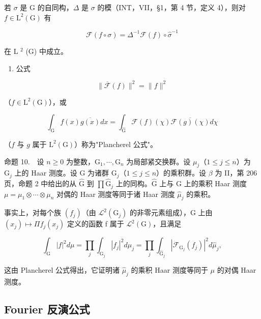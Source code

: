 若 \(\sigma\) 是 G 的自同构，\(\Delta\) 是 \(\sigma\) 的模（INT，VII，§1，第 4 节，定义 4），则对 \(f \in \mathrm{L}^2(\mathrm{G})\) 有

\[
\mathcal {F} (f \circ \sigma) = \Delta^ {- 1} \mathcal {F} (f) \circ \widehat {\sigma} ^ {- 1}
\]

在 L \(^{2}\) (G) 中成立。

\begin{enumerate}
\def\labelenumi{\arabic{enumi})}
\setcounter{enumi}{1}
\tightlist
\item
  公式
\end{enumerate}

\[
\| \overline {{\mathcal {F}}} (f) \| ^ {2} = \| f \| ^ {2}\tag{23}
\]

（\(f\in \mathrm{L}^2 (\mathrm{G})\)），或

\[
\int_ {\mathrm{G}} f (x) \overline {{g (x)}} d x = \int_ {\widehat {\mathrm{G}}} \mathcal {F} (f) (\chi) \overline {{\mathcal {F} (g) (\chi)}} d \chi\tag{24}
\]

（\(f\) 与 \(g\) 属于 \(\mathrm{L}^2 (\mathrm{G})\)）称为"Plancherel 公式"。

命题 10.　设 \(n \geqslant 0\) 为整数，\(\mathrm{G}_{1}, \cdots, \mathrm{G}_{n}\) 为局部紧交换群。设 \(\mu_{j}\)（\(1 \leqslant j \leqslant n\)）为 \(\mathrm{G}_{j}\) 上的 Haar 测度。设 G 为诸群 \(\mathrm{G}_{j}\)（\(1 \leqslant j \leqslant n\)）的乘积群。设 \(\beta\) 为 II，第 206 页，命题 2 中给出的从 \(\widehat{\mathrm{G}}\) 到 \(\prod \widehat{\mathrm{G}}_{j}\) 上的同构。\(\widehat{\mathrm{G}}\) 上与 G 上的乘积 Haar 测度 \(\mu = \mu_{1} \otimes \cdots \otimes \mu_{n}\) 对偶的 Haar 测度等同于诸 Haar 测度 \(\widehat{\mu}_{j}\) 的乘积。

事实上，对每个族 \((f_{j})\)（由 \(\mathcal{L}^{2}(\mathrm{G}_{j})\) 的非零元素组成），G 上由 \((x_{j})\mapsto\Pi f_{j}(x_{j})\) 定义的函数 f 属于 \(\mathcal{L}^{2}(\mathrm{G})\)，且满足

\[
\int_ {\mathrm{G}} | f | ^ {2} d \mu = \prod_ {j} \int_ {\mathrm{G} _ {j}} | f _ {j} | ^ {2} d \mu_ {j} = \prod_ {j} \int_ {\widehat {\mathrm{G}} _ {j}} | \mathcal {F} _ {\mathrm{G} _ {j}} (f _ {j}) | ^ {2} d \widehat {\mu} _ {j},
\]

这由 Plancherel 公式得出，它证明诸 \(\widehat{\mu}_{j}\) 的乘积 Haar 测度等同于 \(\mu\) 的对偶 Haar 测度。

\subsection{Fourier 反演公式}

